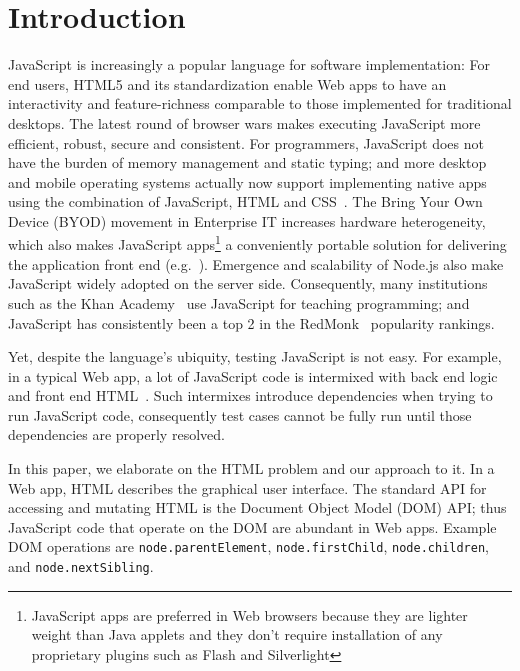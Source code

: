 \section{Introduction}
JavaScript is increasingly a popular language for software implementation: %
For end users, HTML5 and its standardization enable Web apps to have an interactivity and feature-richness comparable to those implemented for traditional desktops.  
The latest round of browser wars makes executing JavaScript more efficient, robust, secure and consistent.  
For programmers, JavaScript does not have the burden of memory management and static typing; and more desktop and mobile operating systems actually now support implementing native apps using the combination of JavaScript, HTML and CSS~\cite{jalangi}.
The Bring Your Own Device (BYOD) movement in Enterprise IT increases hardware heterogeneity, which also makes JavaScript apps\footnote{JavaScript apps are preferred in Web browsers because they are lighter weight than Java applets and they don't require installation of any proprietary plugins such as Flash and Silverlight} a conveniently portable solution for delivering the application front end (e.g.~\cite{BNSFoffice365}).
Emergence and scalability of Node.js also make JavaScript widely adopted on the server side.
Consequently, many institutions such as the Khan Academy~\cite{khanAcademy} use JavaScript for teaching programming; and JavaScript has consistently been a top 2 in the RedMonk~\cite{redmonk} popularity rankings.%

Yet, despite the language's ubiquity, testing JavaScript is not easy.
For example, in a typical Web app, a lot of JavaScript code is intermixed with back end logic and front end HTML~\cite{QUnitIntro}.
Such intermixes introduce dependencies when trying to run JavaScript code, consequently test cases cannot be fully run until those dependencies are properly resolved.

In this paper, we elaborate on the HTML problem and our approach to it.
In a Web app, HTML describes the graphical user interface.  The standard API for accessing and mutating HTML is the Document Object Model (DOM) API; thus JavaScript code that operate on the DOM are abundant in Web apps.
Example DOM operations are {\tt node.parentElement}, {\tt node.firstChild}, {\tt node.children}, and {\tt node.nextSibling}.

